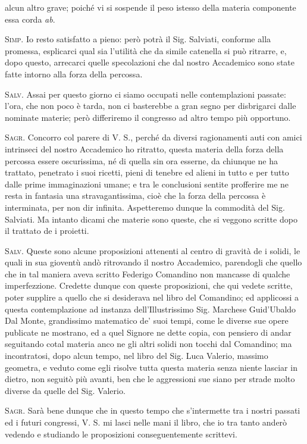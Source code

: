 \documentclass[11pt,twoside,openany]{book}
\newcommand{\speaker}[1]{\textcolor{rubric}{\textsc{#1}}\space}
\begin{document}
alcun altro grave; poiché vi si sospende il peso istesso della materia componente essa corda \emph{ab}.

\speaker{Simp.} Io resto satisfatto a pieno: però potrà il Sig. Salviati, conforme alla promessa, esplicarci qual sia l'utilità che da simile catenella si può ritrarre, e, dopo questo, arrecarci quelle specolazioni che dal nostro Accademico sono state fatte intorno alla forza della percossa.

\speaker{Salv.} Assai per questo giorno ci siamo occupati nelle contemplazioni passate: l'ora, che non poco è tarda, non ci basterebbe a gran segno per disbrigarci dalle nominate materie; però differiremo il congresso ad altro tempo più opportuno.

\speaker{Sagr.} Concorro col parere di V. S., perché da diversi ragionamenti auti con amici intrinseci del nostro Accademico ho ritratto, questa materia della forza della percossa essere oscurissima, né di quella sin ora esserne, da chiunque ne ha trattato, penetrato i suoi ricetti, pieni di tenebre ed alieni in tutto e per tutto dalle prime immaginazioni umane; e tra le conclusioni sentite profferire me ne resta in fantasia una stravagantissima, cioè che la forza della percossa è interminata, per non dir infinita. Aspetteremo dunque la commodità del Sig. Salviati. Ma intanto dicami che materie sono queste, che si veggono scritte dopo il trattato de i proietti.

\speaker{Salv.} Queste sono alcune proposizioni attenenti al centro di gravità de i solidi, le quali in sua gioventù andò ritrovando il nostro Accademico, parendogli che quello che in tal maniera aveva scritto Federigo Comandino non mancasse di qualche imperfezzione. Credette dunque con queste proposizioni, che qui vedete scritte, poter supplire a quello che si desiderava nel libro del Comandino; ed applicossi a questa contemplazione ad instanza dell'Illustrissimo Sig. Marchese Guid'Ubaldo Dal Monte, grandissimo matematico de' suoi tempi, come le diverse sue opere publicate ne mostrano, ed a quel Signore ne dette copia, con pensiero di andar seguitando cotal materia anco ne gli altri solidi non tocchi dal Comandino; ma incontratosi, dopo alcun tempo, nel libro del Sig. Luca Valerio, massimo geometra, e veduto come egli risolve tutta questa materia senza niente lasciar in dietro, non seguitò più avanti, ben che le aggressioni sue siano per strade molto diverse da quelle del Sig. Valerio.

\speaker{Sagr.} Sarà bene dunque che in questo tempo che s'intermette tra i nostri passati ed i futuri congressi, V. S. mi lasci nelle mani il libro, che io tra tanto anderò vedendo e studiando le proposizioni conseguentemente scrittevi.
\end{document}
